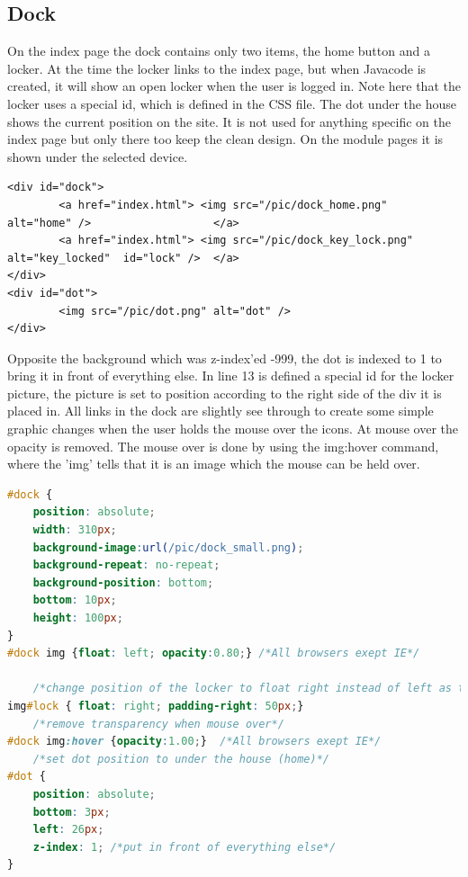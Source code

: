 \subsection{Dock}
On the index page the dock contains only two items, the home button and a locker. At the time the locker links to the index page, but when Javacode is created, it will show an open locker when the user is logged in. Note here that the locker uses a special id, which is defined in the CSS file. The dot under the house shows the current position on the site. It is not used for anything specific on the index page but only there too keep the clean design. On the module pages it is shown under the selected device.
\begin{lstlisting}
<div id="dock">
		<a href="index.html"> <img src="/pic/dock_home.png" 		alt="home" /> 					</a>
		<a href="index.html"> <img src="/pic/dock_key_lock.png" 	alt="key_locked"  id="lock" /> 	</a>
</div>
<div id="dot">
		<img src="/pic/dot.png" alt="dot" />
</div>
\end{lstlisting}
Opposite the background which was z-index'ed -999, the dot is indexed to 1 to bring it in front of everything else. In line 13 is defined a special id for the locker picture, the picture is set to position according to the right side of the div it is placed in. All links in the dock are slightly see through to create some simple graphic changes when the user holds the mouse over the icons. At mouse over the opacity is removed. The mouse over is done by using the img:hover command, where the 'img' tells that it is an image which the mouse can be held over.
\begin{lstlisting}[language=CSS]
#dock {
	position: absolute;
	width: 310px;
	background-image:url(/pic/dock_small.png);
	background-repeat: no-repeat;
	background-position: bottom;
	bottom: 10px;
	height: 100px;
}
#dock img {float: left; opacity:0.80;} /*All browsers exept IE*/

	/*change position of the locker to float right instead of left as the other link(s)*/
img#lock { float: right; padding-right: 50px;}
	/*remove transparency when mouse over*/
#dock img:hover {opacity:1.00;}  /*All browsers exept IE*/
	/*set dot position to under the house (home)*/
#dot {
	position: absolute;
	bottom: 3px;
	left: 26px;
	z-index: 1; /*put in front of everything else*/
}
\end{lstlisting}
